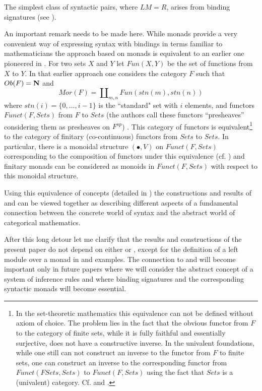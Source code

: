 \documentclass[11pt]{article}
\newcommand{\nn}{{\bf N\rm}}
\begin{document}
The simplest class of syntactic pairs, where $LM=R$, arises from binding signatures (see \cite[p.228]{HM2007}). 


An important remark needs to be made here. While monads provide a very convenient way of expressing syntax with bindings in terms familiar to mathematicians the approach based on monads is equivalent to an earlier one pioneered in \cite{FPT}. For two sets $X$ and $Y$ let $Fun(X,Y)$ be the set of functions from $X$ to $Y$.  In that earlier approach one considers the category $F$ such that $Ob(F)=\nn$ and
%
$$Mor(F)=\amalg_{m,n}Fun(stn(m),stn(n))$$
%
where $stn(i)=\{0,\dots,i-1\}$ is the ``standard" set with $i$ elements, and functors $Funct(F,Sets)$ from $F$ to $Sets$ (the authors call these functors ``presheaves'' considering them as presheaves on $F^{op}$) . This category of functors is equivalent\footnote{In the set-theoretic mathematics this equivalence can not be defined without axiom of choice. The problem lies in the fact that the obvious functor from $F$ to the category of finite sets, while it is  fully faithful and essentially surjective, does not have a constructive inverse. In the univalent foundations, while one still can not construct an inverse to the functor from $F$ to finite sets, one can construct an inverse to the corresponding functor from $Funct(FSets,Sets)$ to $Funct(F,Sets)$ using the fact that $Sets$ is a (univalent) category. Cf. \cite{RezkCompletion} and \cite[RezkCompletion library]{UniMath}.} to the category of finitary (co-continuous) functors from $Sets$ to $Sets$. In particular, there is a monoidal structure $(\bullet,V)$ on $Funct(F,Sets)$ corresponding to the composition of functors under this equivalence (cf. \cite[Sec. 3]{FPT}) and finitary monads can be considered as monoids in $Funct(F,Sets)$ with respect to this monoidal structure. 

Using this equivalence of concepts (detailed in \cite{}) the constructions and results of \cite{HM2007} and \cite{FPT} can be viewed together as describing different aspects of a fundamental connection between the concrete world of syntax and the abstract world of categorical mathematics. 

After this long detour let me clarify that the results and constructions of the present paper do not depend on either \cite{HM2007} or \cite{FPT}, except for the definition of a left module over a monad in \cite{HM2007} and examples. The connection to \cite{HM2007} and \cite{FPT} will become important only in future papers where we will consider the abstract concept of a system of inference rules and where binding signatures and the corresponding syntactic monads will become essential. 
\end{document}
